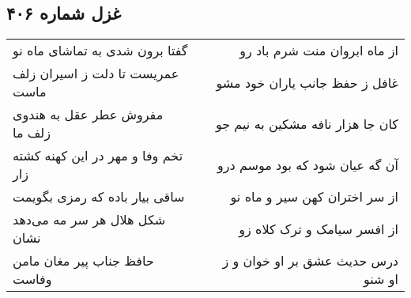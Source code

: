 \begin{center}
\section*{غزل شماره ۴۰۶}
\label{sec:sh406}
\begin{longtable}{l p{0.5cm} r}
گفتا برون شدی به تماشای ماه نو
&&
از ماه ابروان منت شرم باد رو
\\
عمریست تا دلت ز اسیران زلف ماست
&&
غافل ز حفظ جانب یاران خود مشو
\\
مفروش عطر عقل به هندوی زلف ما
&&
کان جا هزار نافه مشکین به نیم جو
\\
تخم وفا و مهر در این کهنه کشته زار
&&
آن گه عیان شود که بود موسم درو
\\
ساقی بیار باده که رمزی بگویمت
&&
از سر اختران کهن سیر و ماه نو
\\
شکل هلال هر سر مه می‌دهد نشان
&&
از افسر سیامک و ترک کلاه زو
\\
حافظ جناب پیر مغان مامن وفاست
&&
درس حدیث عشق بر او خوان و ز او شنو
\\
\end{longtable}
\end{center}
